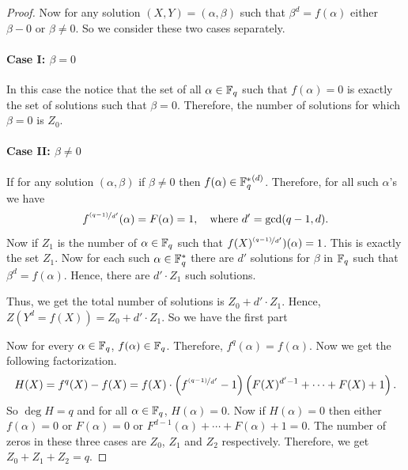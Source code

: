 \begin{proof}
  Now for any solution $(X,Y)=(\alpha,\beta)$ such that $\beta^d=f(\alpha)$ either $\beta-0$ or $\beta\neq 0$. So we consider these two cases separately.
  \paragraph*{Case I: $\beta=0$} In this case the notice that the set of all $\alpha\in\mathbb{F}_q$ such that $f(\alpha)=0$ is exactly the set of solutions such that $\beta=0$. Therefore, the number of solutions for which $\beta=0$ is $Z_0$. 
  \paragraph*{Case II: $\beta\neq 0$} If for any solution $(\alpha,\beta)$ if $\beta\neq 0$ then $f(\alpha)\in {\mathbb{F}_q^*}^{(d)}$. Therefore, for all such $\alpha$'s we have $$f^{\nicefrac{(q-1)}{d'}}(\alpha)=F(\alpha)=1,\quad \text{where }d'=\gcd(q-1,d).$$ Now if $Z_1$ is the number of $\alpha\in\mathbb{F}_q$ such that $f(X)^{\nicefrac{(q-1)}{d'}})(\alpha)=1$. This is exactly the set $Z_1$. Now for each such $\alpha\in\mathbb{F}_q^*$ there are $d'$ solutions for $\beta$ in $\mathbb{F}_q$ such that $\beta^d=f(\alpha)$. Hence, there are $d'\cdot Z_1$ such solutions. 
  
  Thus, we get the total number of solutions is $Z_0+d'\cdot Z_1$. Hence, $Z(Y^d=f(X))=Z_0+d'\cdot Z_1$. So we have the first part
  
  Now for every $\alpha\in\mathbb{F}_q$, $f(\alpha)\in\mathbb{F}_q$. Therefore, $f^q(\alpha)=f(\alpha)$. Now we get the following factorization.
  $$H(X)=f^q(X)-f(X)=f(X)\cdot \left(f^{\nicefrac{(q-1)}{d'}}-1\right)\left(F(X)^{d'-1}+\cdots + F(X)+1\right).$$ So $\deg H=q$ and for all $\alpha\in\mathbb{F}_q$, $H(\alpha)=0$. Now if $H(\alpha)=0$ then either $f(\alpha)=0$ or $F(\alpha)=0$ or $F^{d-1}(\alpha)+\cdots +F(\alpha)+1=0$. The number of zeros in these three cases are $Z_0$, $Z_1$ and $Z_2$ respectively. Therefore, we get $Z_0+Z_1+Z_2=q$. 
\end{proof}
